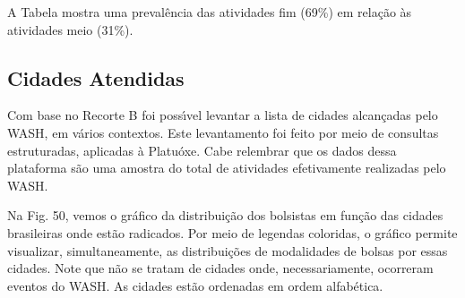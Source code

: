 \documentclass[
12pt,		%
openright,	%
twoside,  %
a4paper,			%
chapter=TITLE,		%
english,			%
french,				%
spanish,			%
brazil				%
]{USPSC-classe/USPSC}
\begin{document}
A Tabela mostra uma preval\^encia das atividades fim (69\%) em rela\c{c}\~ao \`as atividades meio (31\%).

















\subsection[Cidades Atendidas]{Cidades Atendidas}\label{Cidades Atendidas}
Com base no Recorte B foi poss\'{\i}vel levantar a lista de cidades alcan\c{c}adas pelo WASH, em v\'arios contextos. Este levantamento foi feito por meio de consultas estruturadas, aplicadas \`a Platu\'oxe. Cabe relembrar que os dados dessa plataforma s\~ao uma amostra do total de atividades efetivamente realizadas pelo WASH.

















Na Fig. 50, vemos o gr\'afico da distribui\c{c}\~ao dos bolsistas em fun\c{c}\~ao das cidades brasileiras onde est\~ao radicados. Por meio de legendas coloridas, o gr\'afico permite visualizar, simultaneamente, as distribui\c{c}\~oes de modalidades de bolsas por essas cidades. Note que n\~ao se tratam de cidades onde, necessariamente, ocorreram eventos do WASH. As cidades est\~ao ordenadas em ordem alfab\'etica.
\end{document}
